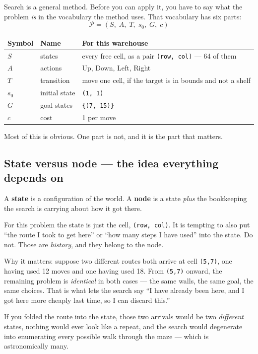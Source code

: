 \documentclass[11pt,a4paper]{article}
\begin{document}
Search is a general method. Before you can apply it, you have to say what the
problem \emph{is} in the vocabulary the method uses. That vocabulary has six
parts:
\[
  \mathcal{P} = (S,\; A,\; T,\; s_0,\; G,\; c)
\]

\begin{center}
\begin{tabular}{@{}lll@{}}
\toprule
\textbf{Symbol} & \textbf{Name} & \textbf{For this warehouse} \\
\midrule
$S$   & states           & every free cell, as a pair \texttt{(row, col)} --- 64 of them \\
$A$   & actions          & Up, Down, Left, Right \\
$T$   & transition       & move one cell, if the target is in bounds and not a shelf \\
$s_0$ & initial state    & \texttt{(1, 1)} \\
$G$   & goal states      & \texttt{\{(7, 15)\}} \\
$c$   & cost             & 1 per move \\
\bottomrule
\end{tabular}
\end{center}

Most of this is obvious. One part is not, and it is the part that matters.

\subsection{State versus node --- the idea everything depends on}

A \textbf{state} is a configuration of the world. A \textbf{node} is a state
\emph{plus} the bookkeeping the search is carrying about how it got there.

For this problem the state is just the cell, \texttt{(row, col)}. It is tempting
to also put ``the route I took to get here'' or ``how many steps I have used''
into the state. Do not. Those are \emph{history}, and they belong to the node.

Why it matters: suppose two different routes both arrive at cell \texttt{(5,7)},
one having used 12 moves and one having used 18. From \texttt{(5,7)} onward, the
remaining problem is \emph{identical} in both cases --- the same walls, the same
goal, the same choices. That is what lets the search say ``I have already been
here, and I got here more cheaply last time, so I can discard this.''

If you folded the route into the state, those two arrivals would be two
\emph{different} states, nothing would ever look like a repeat, and the search
would degenerate into enumerating every possible walk through the maze --- which
is astronomically many.
\end{document}
